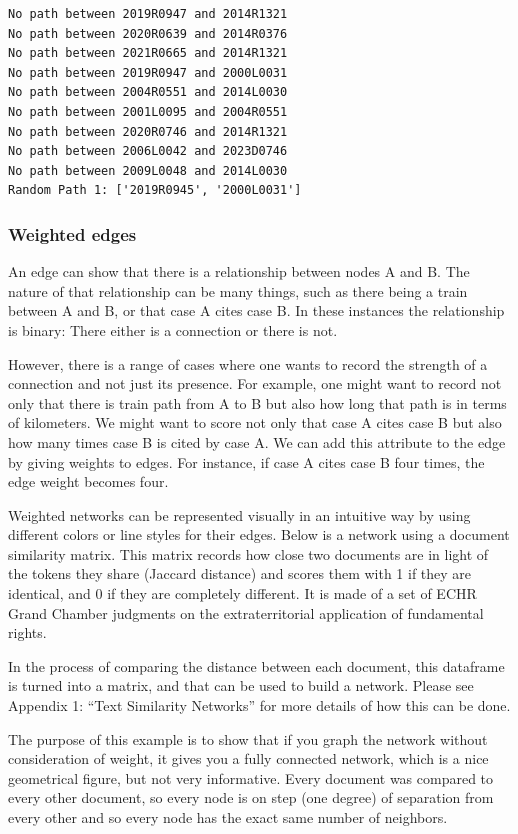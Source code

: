    \begin{Verbatim}[commandchars=\\\{\}]
No path between 2019R0947 and 2014R1321
No path between 2020R0639 and 2014R0376
No path between 2021R0665 and 2014R1321
No path between 2019R0947 and 2000L0031
No path between 2004R0551 and 2014L0030
No path between 2001L0095 and 2004R0551
No path between 2020R0746 and 2014R1321
No path between 2006L0042 and 2023D0746
No path between 2009L0048 and 2014L0030
Random Path 1: ['2019R0945', '2000L0031']
    \end{Verbatim}

    \hypertarget{weighted-edges}{%
\subsubsection{Weighted edges}\label{weighted-edges}}

An edge can show that there is a relationship between nodes A and B. The
nature of that relationship can be many things, such as there being a
train between A and B, or that case A cites case B. In these instances
the relationship is binary: There either is a connection or there is
not.

However, there is a range of cases where one wants to record the
strength of a connection and not just its presence. For example, one
might want to record not only that there is train path from A to B but
also how long that path is in terms of kilometers. We might want to
score not only that case A cites case B but also how many times case B
is cited by case A. We can add this attribute to the edge by giving
weights to edges. For instance, if case A cites case B four times, the
edge weight becomes four.

Weighted networks can be represented visually in an intuitive way by
using different colors or line styles for their edges. Below is a
network using a document similarity matrix. This matrix records how
close two documents are in light of the tokens they share (Jaccard
distance) and scores them with 1 if they are identical, and 0 if they
are completely different. It is made of a set of ECHR Grand Chamber
judgments on the extraterritorial application of fundamental rights.

    In the process of comparing the distance between each document, this
dataframe is turned into a matrix, and that can be used to build a
network. Please see Appendix 1: ``Text Similarity Networks'' for more
details of how this can be done.

The purpose of this example is to show that if you graph the network
without consideration of weight, it gives you a fully connected network,
which is a nice geometrical figure, but not very informative. Every
document was compared to every other document, so every node is on step
(one degree) of separation from every other and so every node has the
exact same number of neighbors.

